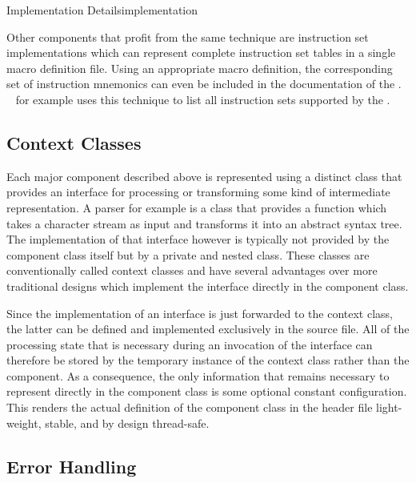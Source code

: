 \begin{presentation}{Implementation Details}{implementation}

Other components that profit from the same technique are instruction set implementations which can represent complete instruction set tables in a single macro definition file.
Using an appropriate macro definition, the corresponding set of instruction mnemonics can even be included in the documentation of the \ecs{}.
\Documentation{}~ for example uses this technique to list all instruction sets supported by the \ecs{}.

\subsection{Context Classes}

Each major component described above is represented using a distinct class that provides an interface for processing or transforming some kind of intermediate representation.
A parser for example is a class that provides a function which takes a character stream as input and transforms it into an abstract syntax tree.
The implementation of that interface however is typically not provided by the component class itself but by a private and nested class.
These classes are conventionally called context classes and have several advantages over more traditional designs which implement the interface directly in the component class.


Since the implementation of an interface is just forwarded to the context class, the latter can be defined and implemented exclusively in the source file.
All of the processing state that is necessary during an invocation of the interface can therefore be stored by the temporary instance of the context class rather than the component.
As a consequence, the only information that remains necessary to represent directly in the component class is some optional constant configuration.
This renders the actual definition of the component class in the header file light-weight, stable, and by design thread-safe.


\subsection{Error Handling}


\end{presentation}
